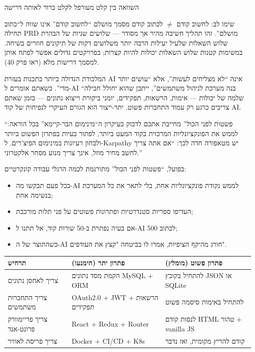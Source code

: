 \begin{center}\small\color{gray}השוואה בין קלט מעורפל לקלט ברור לאותה דרישה\end{center}

\begin{tcbwarn}{שימו לב: לחשוב קודם $\neq$ לכתוב קודם מסמך מושלם}
“לחשוב קודם” אינו שווה ל“כתוב תחילה PRD מושלם”. זהו תהליך חשיבה מהיר אך מסודר — שלושים שניות של הבהרת שלוש השאלות שלעיל יעילות הרבה יותר משלושים דקות של תיקונים חוזרים בשיחה. במשימות קטנות שלוש השאלות יכולות להיות קצרות; בפרויקטים גדולים אפשר לפתח אותן למסמך דרישות מלא (ראו פרק 40).

\end{tcbwarn}


המלכודת הגדולה ביותר בתכנות בעזרת AI אינה “לא מצליחים לעשות”, אלא “עושים יותר מדי”. כשאתם אומרים ל-AI “בנה מערכת לניהול משתמשים”, ייתכן שהוא יחולל חבילה שלמה של יכולות — אימות, הרשאות, תפקידים, יומני ביקורת וייצוא נתונים — בזמן שאתם צריכים כרגע רק עמוד התחברות פשוט. יתר-ייצור הוא הגורם העיקרי לנפיחות של קוד AI.

“פשטות לפני הכול” מחייבת אתכם לדבוק בעיקרון ה“מינימום הבר-קיימא” בכל הוראה: לממש את הפונקציונליות המרכזית בקוד המעט ביותר, לפתור בעיות בפתרון הפשוט ביותר ולבחון רעיונות במינימום הפיצ'רים. ל-Karpathy יש מטאפורה חדה לכך: “אם אתה צריך לחשב מחיר מוזל, אינך צריך מנוע מסחר אלקטרוני.”

בפועל, “פשטות לפני הכול” מתורגמת לכמה הרגלי עבודה קונקרטיים:

\begin{itemize}
  \item בכל פעם תבקשו מה-AI לממש נקודת פונקציונליות אחת, בלי לתאר את כל המערכת בנשימה אחת;
  \item העדיפו ספריות סטנדרטיות ופתרונות פשוטים על פני תלות מורכבת;
  \item אם בעיה נפתרת ב-50 שורות קוד, אל תתנו ל-AI לכתוב 500;
  \item כשהתוצר של ה-AI חורג מהיקף הציפיות, אמרו לו בביטחה "קצץ את העודפים".
\end{itemize}

\begin{center}
\begin{tabularx}{\linewidth}{|X|X|X|}
\hline
\textbf{תרחיש} & \textbf{פתרון יתר (הימנעו)} & \textbf{פתרון פשוט (מומלץ)} \tabularnewline
\hline
צריך לאחסן נתונים & הקמת מסד נתונים MySQL + ORM & להתחיל בקובץ JSON או SQLite \tabularnewline
צריך התחברות משתמשים & OAuth2.0 + JWT + הרשאות תפקידים & להתחיל באימות סיסמה פשוט \tabularnewline
צריך פריימוורק פרונט-אנד & React + Redux + Router & לנסות קודם HTML טהור + vanilla JS \tabularnewline
צריך פריסה לאוויר & Docker + CI/CD + K8s & קודם להריץ מקומית, ואז נדבר \tabularnewline
\hline
\end{tabularx}
\end{center}

